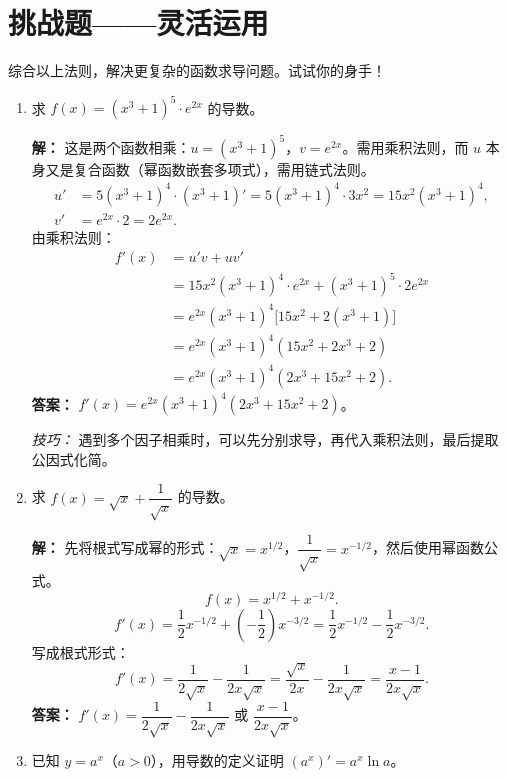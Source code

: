 \documentclass[10pt]{article}
\begin{document}
\section{挑战题——灵活运用}
综合以上法则，解决更复杂的函数求导问题。试试你的身手！

\begin{enumerate}[label=\arabic*., resume]
    \item 求 $f(x) = (x^3+1)^5 \cdot e^{2x}$ 的导数。
    
    \textbf{解：} 这是两个函数相乘：$u = (x^3+1)^5$，$v = e^{2x}$。需用乘积法则，而 $u$ 本身又是复合函数（幂函数嵌套多项式），需用链式法则。
    \begin{align*}
        u' &= 5(x^3+1)^4 \cdot (x^3+1)' = 5(x^3+1)^4 \cdot 3x^2 = 15x^2 (x^3+1)^4, \\
        v' &= e^{2x} \cdot 2 = 2e^{2x}.
    \end{align*}
    由乘积法则：
    \begin{align*}
        f'(x) &= u' v + u v' \\
        &= 15x^2 (x^3+1)^4 \cdot e^{2x} + (x^3+1)^5 \cdot 2e^{2x} \\
        &= e^{2x} (x^3+1)^4 \bigl[ 15x^2 + 2(x^3+1) \bigr] \\
        &= e^{2x} (x^3+1)^4 (15x^2 + 2x^3 + 2) \\
        &= e^{2x} (x^3+1)^4 (2x^3 + 15x^2 + 2).
    \end{align*}
    \textbf{答案：} $f'(x) = e^{2x} (x^3+1)^4 (2x^3 + 15x^2 + 2)$。
    
    \textit{技巧：} 遇到多个因子相乘时，可以先分别求导，再代入乘积法则，最后提取公因式化简。

    \item 求 $f(x) = \sqrt{x} + \dfrac{1}{\sqrt{x}}$ 的导数。
    
    \textbf{解：} 先将根式写成幂的形式：$\sqrt{x} = x^{1/2}$，$\dfrac{1}{\sqrt{x}} = x^{-1/2}$，然后使用幂函数公式。
    $$f(x) = x^{1/2} + x^{-1/2}.$$
    $$f'(x) = \frac{1}{2} x^{-1/2} + \left(-\frac{1}{2}\right) x^{-3/2} = \frac{1}{2} x^{-1/2} - \frac{1}{2} x^{-3/2}.$$
    写成根式形式：
    $$f'(x) = \frac{1}{2\sqrt{x}} - \frac{1}{2x\sqrt{x}} = \frac{\sqrt{x}}{2x} - \frac{1}{2x\sqrt{x}} = \frac{x-1}{2x\sqrt{x}}.$$
    \textbf{答案：} $f'(x) = \dfrac{1}{2\sqrt{x}} - \dfrac{1}{2x\sqrt{x}}$ 或 $\dfrac{x-1}{2x\sqrt{x}}$。

    \item 已知 $y = a^x$（$a>0$），用导数的定义证明 $(a^x)' = a^x \ln a$。
    

\end{enumerate}
\end{document}
